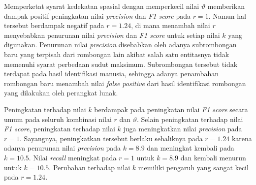Memperketat syarat kedekatan spasial dengan memperkecil nilai $\vartheta$ memberikan dampak positif peningkatan nilai \textit{precision} dan \textit{F1 score} pada $r = 1$. Namun hal tersebut berdampak negatif pada $r = 1.24$, di mana menambah nilai $r$ menyebabkan penurunan nilai \textit{precision} dan \textit{F1 score} untuk setiap nilai $k$ yang digunakan. Penurunan nilai \textit{precision} disebabkan oleh adanya subrombongan baru yang terpisah dari rombongan lain akibat salah satu entitasnya tidak memenuhi syarat perbedaan sudut maksimum. Subrombongan tersebut tidak terdapat pada hasil identifikasi manusia, sehingga adanya penambahan rombongan baru menambah nilai \textit{false positive} dari hasil identifikasi rombongan yang dilakukan oleh perangkat lunak.

Peningkatan terhadap nilai $k$ berdampak pada peningkatan nilai \textit{F1 score} secara umum pada seluruh kombinasi nilai $r$ dan $\vartheta$. Selain peningkatan terhadap nilai \textit{F1 score}, peningkatan terhadap nilai $k$ juga meningkatkan nilai \textit{precision} pada $r = 1$. Sayangnya, peningkatkan tersebut berlaku sebaliknya pada $r = 1.24$ karena adanya penurunan nilai \textit{precision} pada $k = 8.9$ dan meningkat kembali pada $k = 10.5$. Nilai \textit{recall} meningkat pada $r = 1$ untuk $k = 8.9$ dan kembali menurun untuk $k = 10.5$. Perubahan terhadap nilai $k$ memiliki pengaruh yang sangat kecil pada $r = 1.24$.


